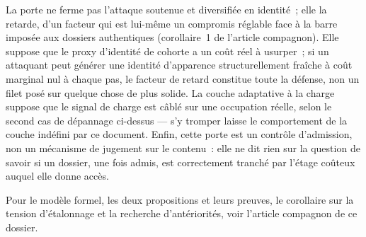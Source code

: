 \documentclass[11pt]{article}
\begin{document}
La porte ne ferme pas l'attaque soutenue et diversifiée en identité~;
elle la retarde, d'un facteur qui est lui-même un compromis réglable
face à la barre imposée aux dossiers authentiques (corollaire~1 de
l'article compagnon). Elle suppose que le proxy d'identité de cohorte a
un coût réel à usurper~; si un attaquant peut générer une identité
d'apparence structurellement fraîche à coût marginal nul à chaque pas,
le facteur de retard constitue toute la défense, non un filet posé sur
quelque chose de plus solide. La couche adaptative à la charge suppose
que le signal de charge est câblé sur une occupation réelle, selon le
second cas de dépannage ci-dessus --- s'y tromper laisse le comportement
de la couche indéfini par ce document. Enfin, cette porte est un contrôle
d'admission, non un mécanisme de jugement sur le contenu~: elle ne dit
rien sur la question de savoir si un dossier, une fois admis, est
correctement tranché par l'étage coûteux auquel elle donne accès.

Pour le modèle formel, les deux propositions et leurs preuves, le
corollaire sur la tension d'étalonnage et la recherche d'antériorités,
voir l'article compagnon de ce dossier.
\end{document}
